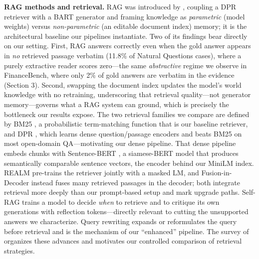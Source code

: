\documentclass[11pt]{article}
\begin{document}
\textbf{RAG methods and retrieval.} RAG was introduced by
\citet{lewis2020rag}, coupling a DPR retriever with a BART generator and
framing knowledge as \emph{parametric} (model weights) versus
\emph{non-parametric} (an editable document index) memory; it is the
architectural baseline our pipelines instantiate. Two of its findings
bear directly on our setting. First, RAG answers correctly even when the
gold answer appears in \emph{no} retrieved passage verbatim (11.8\% of
Natural Questions cases), where a purely extractive reader scores
zero---the same \emph{abstractive} regime we observe in FinanceBench,
where only 2\% of gold answers are verbatim in the evidence (Section 3).
Second, swapping the document index updates the model's world knowledge
with no retraining, underscoring that retrieval quality---not generator
memory---governs what a RAG system can ground, which is precisely the
bottleneck our results expose. The two retrieval families we compare are
defined by BM25 \citep{robertson2009bm25}, a probabilistic term-matching
function that is our baseline retriever, and DPR
\citep{karpukhin2020dpr}, which learns dense question/passage encoders
and beats BM25 on most open-domain QA---motivating our dense pipeline.
That dense pipeline embeds chunks with Sentence-BERT
\citep{reimers2019sbert}, a siamese-BERT model that produces
semantically comparable sentence vectors, the encoder behind our MiniLM
index. REALM \citep{guu2020realm} pre-trains the retriever jointly with
a masked LM, and Fusion-in-Decoder \citep{izacard2021fid} instead fuses
many retrieved passages in the decoder; both integrate retrieval more
deeply than our prompt-based setup and mark upgrade paths. Self-RAG
\citep{asai2024selfrag} trains a model to decide \emph{when} to retrieve
and to critique its own generations with reflection tokens---directly
relevant to cutting the unsupported answers we characterize. Query
rewriting \citep{ma2023queryrewriting} expands or reformulates the query
before retrieval and is the mechanism of our ``enhanced'' pipeline. The
survey of \citet{gao2023ragsurvey} organizes these advances and
motivates our controlled comparison of retrieval strategies.
\end{document}
